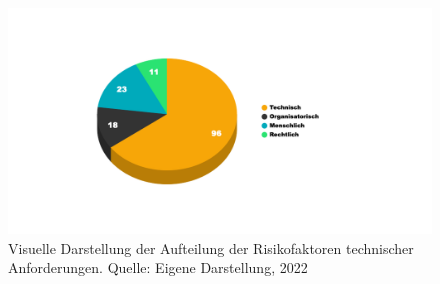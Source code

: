 \begin{figure}[H]
    \centering
  \includegraphics[width=\linewidth]{images/uploads/a_figure_05.png}
  \caption{Visuelle Darstellung der Aufteilung der Risikofaktoren technischer Anforderungen. Quelle: Eigene Darstellung, 2022}
  \label{fig:risiko_technisch_aufteilung}
\end{figure}

